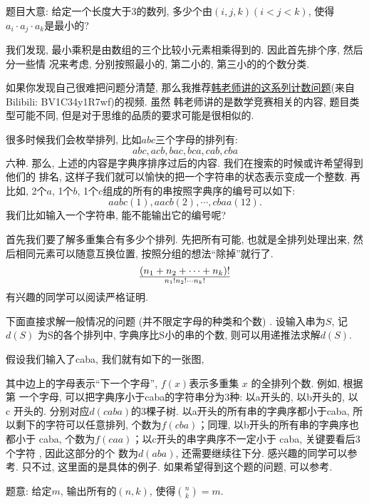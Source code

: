 题目大意: 给定一个长度大于3的数列, 多少个由$(i,j,k)(i < j < k) $, 使得$a_i\cdot a_j\cdot a_k$是最小的? 

我们发现, 最小乘积是由数组的三个比较小元素相乘得到的. 因此首先排个序, 然后分一些情
况来考虑, 分别按照最小的, 第二小的, 第三小的的个数分类. 

如果你发现自己很难把问题分清楚, 那么我推荐\href{https://www.bilibili.com/video/BV1C34y1R7wf}{韩老师讲的这系列计数问题}(来自Bilibili: BV1C34y1R7wf)的视频. 虽然
韩老师讲的是数学竞赛相关的内容, 题目类型可能不同, 但是对于思维的品质的要求可能是很相似的. 

 很多时候我们会枚举排列, 比如$abc$三个字母的排列有: 
$$
abc, acb, bac, bca, cab, cba
$$
六种. 那么, 上述的内容是字典序排序过后的内容. 我们在搜索的时候或许希望得到他们的
排名, 这样子我们就可以愉快的把一个字符串的状态表示变成一个整数. 再比如, 2个$a$, 
1个$b$, 1个$c$组成的所有的串按照字典序的编号可以如下: 
$$
aabc(1), aacb(2), \cdots, cbaa(12).
$$
我们比如输入一个字符串, 能不能输出它的编号呢? 

首先我们要了解多重集合有多少个排列. 先把所有可能, 也就是全排列处理出来, 
然后相同元素可以随意互换位置, 按照分组的想法``除掉''就行了. 
$$
(n_1+n_2+\cdots+n_k)!\over n_1!n_2!\cdots n_k!
$$
有兴趣的同学可以阅读严格证明. 

下面直接求解一般情况的问题 (并不限定字母的种类和个数) . 设输入串为$S$, 记$d(S)$
为S的各个排列中, 字典序比S小的串的个数, 则可以用递推法求解$d(S)$.

假设我们输入了caba, 我们就有如下的一张图,


其中边上的字母表示“下一个字母”, $f(x)$表示多重集 $x$ 的全排列个数. 例如, 根据第
一个字母, 可以把字典序小于caba的字符串分为3种: 以a开头的, 以b开头的, 以 c 开头的.
分别对应$d(caba)$的3棵子树. 以a开头的所有串的字典序都小于caba, 
所以剩下的字符可以任意排列, 个数为$f(cba)$；同理, 以b开头的所有串的字典序也都小于 caba, 
个数为$f(caa)$；以c开头的串字典序不一定小于 caba, 关键要看后3个字符 , 因此这部分的个
数为$d(aba)$, 还需要继续往下分. 感兴趣的同学可以参考. 
只不过, 这里面的是具体的例子. 如果希望得到这个题的问题, 可以参考. 


题意: 给定$m$, 输出所有的$(n,k)$, 使得$\binom nk=m$. 